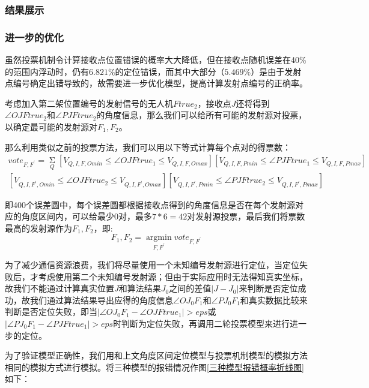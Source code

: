 \documentclass{ctexart}
\begin{document}
  \subsubsection{结果展示}

  \subsubsection{进一步的优化}

  虽然投票机制令计算接收点位置错误的概率大大降低，但在接收点随机误差在40\%的范围内浮动时，仍有$6.821\%$的定位错误，而其中大部分（$5.469\%$）是由于发射点编号确定出错导致的，故需要进一步优化模型，提高计算发射点编号的正确率。

  考虑加入第二架位置编号的发射信号的无人机$Ftrue_2$，接收点$J$还将得到$\angle OJFtrue_2$和$\angle PJFtrue_2$的角度信息，那么我们可以给所有可能的发射源对投票，以确定最可能的发射源对$F_1,F_2$。

  那么利用类似之前的投票方法，我们可以用以下等式计算每个点对的得票数：
\begin{equation}
\begin{split}
    vote_{F,F^{'}}=\mathop{\Sigma}\limits_{Q} [V_{Q,I,F,Omin} \le \angle OJFtrue_1 \le V_{Q,I,F,Omax}][V_{Q,I,F,Pmin} \le \angle PJFtrue_1 \le V_{Q,I,F,Pmax}]\\
    [V_{Q,I,F^{'},Omin} \le \angle OJFtrue_2 \le V_{Q,I,F^{'},Omax}][V_{Q,I,F^{'},Pmin} \le \angle PJFtrue_2 \le V_{Q,I,F^{'},Pmax}]
\end{split}
\end{equation}

即400个误差圆中，每个误差圆都根据接收点得到的角度信息是否在每个发射源对应的角度区间内，可以给最少$0$对，最多$7*6=42$对发射源投票，最后我们将票数最高的发射源作为$F_1,F_2$，即:
\begin{equation}
 F_1,F_2=\mathop{\arg\min}\limits_{F,F^{'}} vote_{F,F^{'}}
\end{equation}

为了减少通信资源浪费，我们将尽量使用一个未知编号发射源进行定位，当定位失败后，才考虑使用第二个未知编号发射源；但由于实际应用时无法得知真实坐标，故我们不能通过计算真实位置$J$和算法结果$J_0$之间的差值$|J-J_0|$来判断是否定位成功，故我们通过算法结果导出应得的角度信息$\angle OJ_0F_1$和$\angle PJ_0F_1$和真实数据比较来判断是否定位失败，即当$|\angle OJ_0F_1 - \angle OJFtrue_1| > eps$或$|\angle PJ_0F_1 - \angle PJFtrue_1| > eps$时判断为定位失败，再调用二轮投票模型来进行进一步的定位。

为了验证模型正确性，我们用和上文角度区间定位模型与投票机制模型的模拟方法相同的模拟方式进行模拟。将三种模型的报错情况作图\ref{三种模型报错概率折线图}如下：
\end{document}
